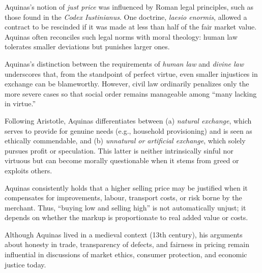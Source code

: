     \begin{remark}
        Aquinas’s notion of \emph{just price} was influenced by Roman legal principles, such as those found in the \textit{Codex Iustinianus}. One doctrine, \textit{laesio enormis}, allowed a contract to be rescinded if it was made at less than half of the fair market value. Aquinas often reconciles such legal norms with moral theology: human law tolerates smaller deviations but punishes larger ones.
    \end{remark}

    \begin{remark}
        Aquinas’s distinction between the requirements of \emph{human law} and \emph{divine law} underscores that, from the standpoint of perfect virtue, even smaller injustices in exchange can be blameworthy. However, civil law ordinarily penalizes only the more severe cases so that social order remains manageable among “many lacking in virtue.”
    \end{remark}

    \begin{remark}
        Following Aristotle, Aquinas differentiates between (a) \emph{natural exchange}, which serves to provide for genuine needs (e.g., household provisioning) and is seen as ethically commendable, and (b) \emph{unnatural or artificial exchange}, which solely pursues profit or speculation. This latter is neither intrinsically sinful nor virtuous but can become morally questionable when it stems from greed or exploits others.
    \end{remark}

    \begin{remark}
        Aquinas consistently holds that a higher selling price may be justified when it compensates for improvements, labour, transport costs, or risk borne by the merchant. Thus, “buying low and selling high” is not automatically unjust; it depends on whether the markup is proportionate to real added value or costs.
    \end{remark}

    \begin{remark}
        Although Aquinas lived in a medieval context (13th century), his arguments about honesty in trade, transparency of defects, and fairness in pricing remain influential in discussions of market ethics, consumer protection, and economic justice today.
    \end{remark}

